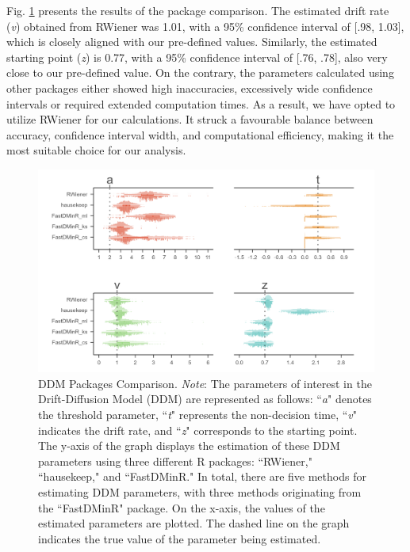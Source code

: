 \documentclass[sn-apa]{sn-jnl}%
\theoremstyle{thmstyleone}%
\theoremstyle{thmstyletwo}%
\theoremstyle{thmstylethree}%
\begin{document}
Fig. \ref{fig:DDM_comparision} presents the results of the package comparison. The estimated drift rate (\textit{v}) obtained from RWiener was 1.01, with a 95\% confidence interval of [.98, 1.03], which is closely aligned with our pre-defined values. Similarly, the estimated starting point (\textit{z}) is 0.77, with a 95\% confidence interval of [.76, .78], also very close to our pre-defined value. On the contrary, the parameters calculated using other packages either showed high inaccuracies, excessively wide confidence intervals or required extended computation times. As a result, we have opted to utilize RWiener for our calculations. It struck a favourable balance between accuracy, confidence interval width, and computational efficiency, making it the most suitable choice for our analysis.

\begin{figure}[!ht]
	\centering
	\includegraphics[width=1\textwidth]{./Figure/Fig2_DDM_comparision.png}
	\caption[DDM Packages Comparison]{DDM Packages Comparison. \textit{Note}: The parameters of interest in the Drift-Diffusion Model (DDM) are represented as follows: ``\textit{a}" denotes the threshold parameter, ``\textit{t}" represents the non-decision time, ``\textit{v}" indicates the drift rate, and ``\textit{z}" corresponds to the starting point. The y-axis of the graph displays the estimation of these DDM parameters using three different R packages: ``RWiener," ``hausekeep," and ``FastDMinR." In total, there are five methods for estimating DDM parameters, with three methods originating from the ``FastDMinR" package. On the x-axis, the values of the estimated parameters are plotted. The dashed line on the graph indicates the true value of the parameter being estimated.
	}\label{fig:DDM_comparision}
\end{figure}
\end{document}
